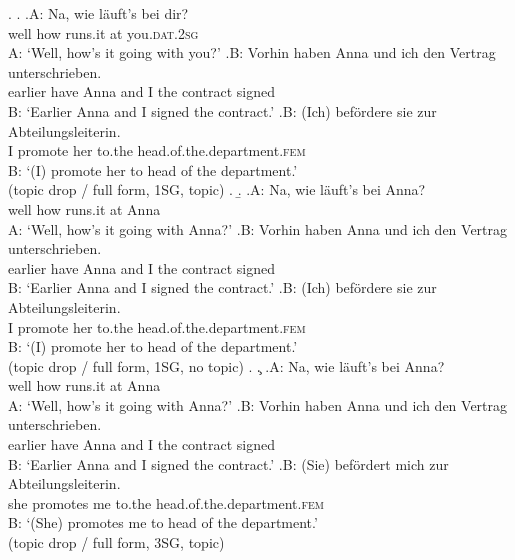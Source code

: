 \ex.\label{ex:item.exp.topic.q1}
\a. 
\ag.\label{ex:item.exp.topic.q1.ai}A: Na, wie läuft's bei dir?\\
{} well how runs.it at you.\textsc{dat.2sg}\\
A: `Well, how's it going with you?'
\bg.\label{ex:item.exp.topic.q1.aii}B: Vorhin haben Anna und ich den Vertrag unterschrieben.\\
{} earlier have Anna and I the contract signed\\
B: `Earlier Anna and I signed the contract.'
\cg.\label{ex:item.exp.topic.q1.aiii}B: (Ich) befördere sie zur Abteilungsleiterin.\\
{} I promote her to.the head.of.the.department.\textsc{fem}\\
B: `(I) promote her to head of the department.' \\\phantom{.}\hfill (topic drop / full form, 1SG, topic)
\z.
\b. 
\ag.\label{ex:item.exp.topic.q1.bi}A: Na, wie läuft's bei Anna?\\
{} well how runs.it at Anna\\
A: `Well, how's it going with Anna?'
\bg.\label{ex:item.exp.topic.q1.bii}B: Vorhin haben Anna und ich den Vertrag unterschrieben.\\
{} earlier have Anna and I the contract signed\\
B: `Earlier Anna and I signed the contract.'
\cg.\label{ex:item.exp.topic.q1.biii}B: (Ich) befördere sie zur Abteilungsleiterin.\\
{} I promote her to.the head.of.the.department.\textsc{fem}\\
B: `(I) promote her to head of the department.'  \\\phantom{.}\hfill (topic drop / full form, 1SG, no topic)
\z.
\c. 
\ag.\label{ex:item.exp.topic.q1.ci}A: Na, wie läuft's bei Anna?\\
{} well how runs.it at Anna\\
A: `Well, how's it going with Anna?'
\bg.\label{ex:item.exp.topic.q1.cii}B: Vorhin haben Anna und ich den Vertrag unterschrieben.\\
{} earlier have Anna and I the contract signed\\
B: `Earlier Anna and I signed the contract.'
\cg.\label{ex:item.exp.topic.q1.ciii}B: (Sie) befördert mich zur Abteilungsleiterin.\\
{} she promotes me to.the head.of.the.department.\textsc{fem}\\
B: `(She) promotes me to head of the department.'  \\\phantom{.}\hfill (topic drop / full form, 3SG, topic)
